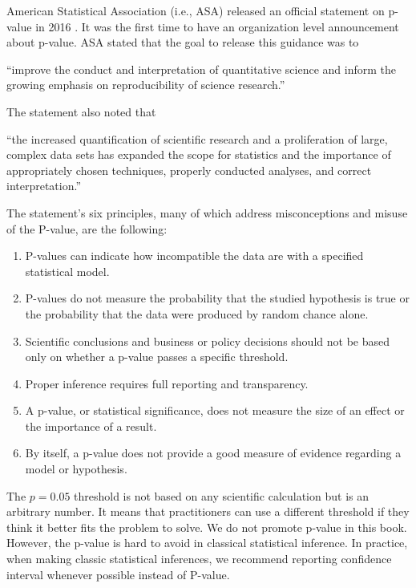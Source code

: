 \documentclass[
  12pt,
]{krantz}
\providecommand{\tightlist}{%
  \setlength{\itemsep}{0pt}\setlength{\parskip}{0pt}}
\renewenvironment{quote}{\begin{VF}}{\end{VF}}
\begin{document}
American Statistical Association (i.e., ASA) released an official statement on p-value in 2016 \citep{ASA_P}. It was the first time to have an organization level announcement about p-value. ASA stated that the goal to release this guidance was to

\begin{quote}
``improve the conduct and interpretation of quantitative science and inform the growing emphasis on reproducibility of science research.''
\end{quote}

The statement also noted that

\begin{quote}
``the increased quantification of scientific research and a proliferation of large, complex data sets has expanded the scope for statistics and the importance of appropriately chosen techniques, properly conducted analyses, and correct interpretation.''
\end{quote}

The statement's six principles, many of which address misconceptions and misuse of the P-value, are the following:

\begin{enumerate}
\def\labelenumi{\arabic{enumi}.}
\tightlist
\item
  P-values can indicate how incompatible the data are with a specified statistical model.
\item
  P-values do not measure the probability that the studied hypothesis is true or the probability that the data were produced by random chance alone.
\item
  Scientific conclusions and business or policy decisions should not be based only on whether a p-value passes a specific threshold.
\item
  Proper inference requires full reporting and transparency.
\item
  A p-value, or statistical significance, does not measure the size of an effect or the importance of a result.
\item
  By itself, a p-value does not provide a good measure of evidence regarding a model or hypothesis.
\end{enumerate}

The \(p = 0.05\) threshold is not based on any scientific calculation but is an arbitrary number. It means that practitioners can use a different threshold if they think it better fits the problem to solve. We do not promote p-value in this book. However, the p-value is hard to avoid in classical statistical inference. In practice, when making classic statistical inferences, we recommend reporting confidence interval whenever possible instead of P-value.
\end{document}
